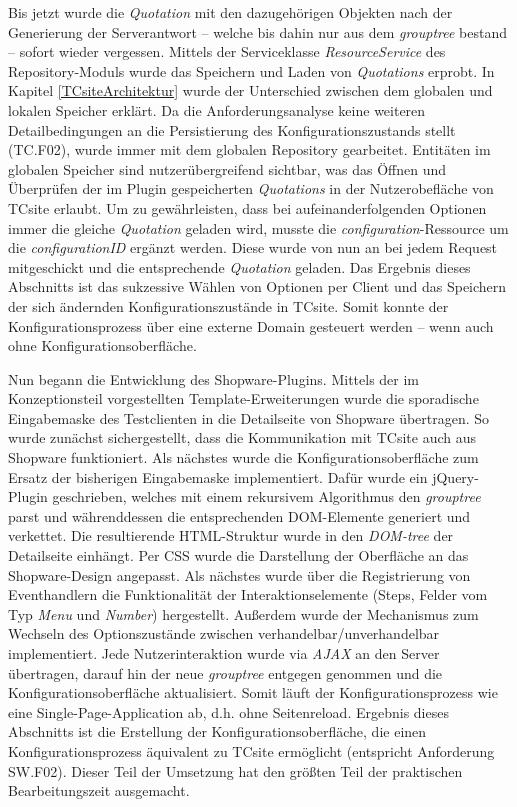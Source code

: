 \documentclass[11pt, a4paper, titlepage, listof=totoc, bibliography=totoc, index=totoc, twoside, openright, headings=normal, draft]{scrreprt}
\begin{document}
Bis jetzt wurde die \emph{Quotation} mit den dazugehörigen Objekten nach der Generierung der Serverantwort -- welche bis dahin nur aus dem \emph{grouptree} bestand -- sofort wieder vergessen. Mittels der Serviceklasse \emph{ResourceService} des Repository-Moduls wurde das Speichern und Laden von \emph{Quotations} erprobt. In Kapitel \ref{TCsiteArchitektur} wurde der Unterschied zwischen dem globalen und lokalen Speicher erklärt. Da die Anforderungsanalyse keine weiteren Detailbedingungen an die Persistierung des Konfigurationszustands stellt (TC.F02), wurde immer mit dem globalen Repository gearbeitet. Entitäten im globalen Speicher sind nutzerübergreifend sichtbar, was das Öffnen und Überprüfen der im Plugin gespeicherten \emph{Quotations} in der Nutzerobefläche von TCsite erlaubt. Um zu gewährleisten, dass bei aufeinanderfolgenden Optionen immer die gleiche \emph{Quotation} geladen wird, musste die \emph{configuration}-Ressource um die \emph{configurationID} ergänzt werden. Diese wurde von nun an bei jedem Request mitgeschickt und die entsprechende \emph{Quotation} geladen. Das Ergebnis dieses Abschnitts ist das sukzessive Wählen von Optionen per Client und das Speichern der sich ändernden Konfigurationszustände in TCsite. Somit konnte der Konfigurationsprozess über eine externe Domain gesteuert werden -- wenn auch ohne Konfigurationsoberfläche.

Nun begann die Entwicklung des Shopware-Plugins. Mittels der im Konzeptionsteil vorgestellten Template-Erweiterungen wurde die sporadische Eingabemaske des Testclienten in die Detailseite von Shopware übertragen. So wurde zunächst sichergestellt, dass die Kommunikation mit TCsite auch aus Shopware funktioniert. Als nächstes wurde die Konfigurationsoberfläche zum Ersatz der bisherigen Eingabemaske implementiert. Dafür wurde ein jQuery-Plugin geschrieben, welches mit einem rekursivem Algorithmus den \emph{grouptree} parst und währenddessen die entsprechenden DOM-Elemente generiert und verkettet. Die resultierende HTML-Struktur wurde in den \emph{DOM-tree} der Detailseite einhängt. Per CSS wurde die Darstellung der Oberfläche an das Shopware-Design angepasst. Als nächstes wurde über die Registrierung von Eventhandlern die Funktionalität der Interaktionselemente (Steps, Felder vom Typ \emph{Menu} und \emph{Number}) hergestellt. Außerdem wurde der Mechanismus zum Wechseln des Optionszustände zwischen verhandelbar/unverhandelbar implementiert. Jede Nutzerinteraktion wurde via \emph{AJAX} an den Server übertragen, darauf hin der neue \emph{grouptree} entgegen genommen und die Konfigurationsoberfläche aktualisiert. Somit läuft der Konfigurationsprozess wie eine Single-Page-Application ab, d.h. ohne Seitenreload. Ergebnis dieses Abschnitts ist die Erstellung der Konfigurationsoberfläche, die einen Konfigurationsprozess äquivalent zu TCsite ermöglicht (entspricht Anforderung SW.F02). Dieser Teil der Umsetzung hat den größten Teil der praktischen Bearbeitungszeit ausgemacht.
\end{document}
